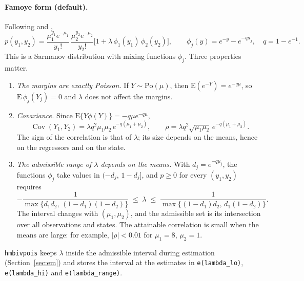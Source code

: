 \documentclass[11pt,a4paper]{article}
\newcommand{\cmd}[1]{\texttt{#1}}
\newcommand{\E}{\mathrm E}
\begin{document}
\paragraph{Famoye form (default).} Following \citet{lakshminarayana1999} and \citet{famoye2010},
\begin{equation}\label{eq:famoye}
p(y_1,y_2)=\frac{\mu_1^{y_1}e^{-\mu_1}}{y_1!}\,\frac{\mu_2^{y_2}e^{-\mu_2}}{y_2!}
\Big[1+\lambda\,\phi_1(y_1)\,\phi_2(y_2)\Big],
\qquad \phi_j(y)=e^{-y}-e^{-q\mu_j},\quad q=1-e^{-1}.
\end{equation}
This is a Sarmanov distribution with mixing functions $\phi_j$. Three properties matter.
\begin{enumerate}
\item \emph{The margins are exactly Poisson.} If $Y\sim\mathrm{Po}(\mu)$, then
$\E(e^{-Y})=e^{-q\mu}$, so $\E\,\phi_j(Y_j)=0$ and $\lambda$ does not affect the margins.
\item \emph{Covariance.} Since $\E\{Y\phi(Y)\}=-q\mu e^{-q\mu}$,
\begin{equation}
\operatorname{Cov}(Y_1,Y_2)=\lambda q^2\mu_1\mu_2\,e^{-q(\mu_1+\mu_2)},\qquad
\rho=\lambda q^2\sqrt{\mu_1\mu_2}\,e^{-q(\mu_1+\mu_2)}.
\end{equation}
The sign of the correlation is that of $\lambda$; its size depends on the means, hence on the
regressors and on the state.
\item \emph{The admissible range of $\lambda$ depends on the means.} With $d_j=e^{-q\mu_j}$, the
functions $\phi_j$ take values in $(-d_j,\,1-d_j]$, and $p\ge0$ for every $(y_1,y_2)$ requires
\begin{equation}\label{eq:range}
-\frac{1}{\max\{d_1d_2,\,(1-d_1)(1-d_2)\}}\;\le\;\lambda\;\le\;
\frac{1}{\max\{(1-d_1)d_2,\,d_1(1-d_2)\}}.
\end{equation}
The interval changes with $(\mu_1,\mu_2)$, and the admissible set is its intersection over all
observations and states. The attainable correlation is small when the means are large: for example,
$|\rho|<0.01$ for $\mu_1=8$, $\mu_2=1$.
\end{enumerate}
\cmd{hmbivpois} keeps $\lambda$ inside the admissible interval during estimation
(Section~\ref{sec:em}) and stores the interval at the estimates in \cmd{e(lambda\_lo)},
\cmd{e(lambda\_hi)} and \cmd{e(lambda\_range)}.
\end{document}
